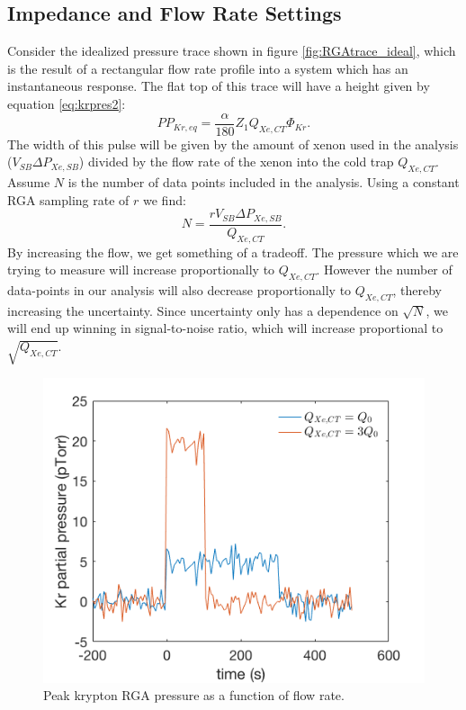 \documentclass[12pt]{article}
\begin{document}
\subsection{Impedance and Flow Rate Settings}
Consider the idealized pressure trace shown in figure \ref{fig:RGAtrace_ideal}, which is the result of a rectangular flow rate profile into a system which has an instantaneous response. The flat top of this trace will have a height given by equation \ref{eq:krpres2}:
\begin{equation}
PP_{Kr,eq}=\frac{\alpha}{180}Z_{1}Q_{Xe,CT}\Phi_{Kr}.
\end{equation}
The width of this pulse will be given by the amount of xenon used in the analysis ($V_{SB}\Delta P_{Xe,SB}$) divided by the flow rate of the xenon into the cold trap $Q_{Xe,CT}$.  Assume $N$ is the number of data points included in the analysis. Using a constant RGA sampling rate of $r$ we find: 
\begin{equation}
N=\frac{rV_{SB}\Delta P_{Xe,SB}}{Q_{Xe,CT}}.
\end{equation}
By increasing the flow, we get something of a tradeoff. The pressure which we are trying to measure will increase proportionally to $Q_{Xe,CT}$. However the number of data-points in our analysis will also decrease proportionally to $Q_{Xe,CT}$, thereby increasing the uncertainty. Since uncertainty only has a dependence on $\sqrt{N}$, we will end up winning in signal-to-noise ratio, which will increase proportional to $\sqrt{Q_{Xe,CT}}$. 
\begin{figure}[h]
  \includegraphics[width=\linewidth]{Figures/RGAtrace_ideal.png}
  \caption{Peak krypton RGA pressure as a function of flow rate.  }
  \label{fig:flowresponse1x}
\end{figure}
\end{document}
